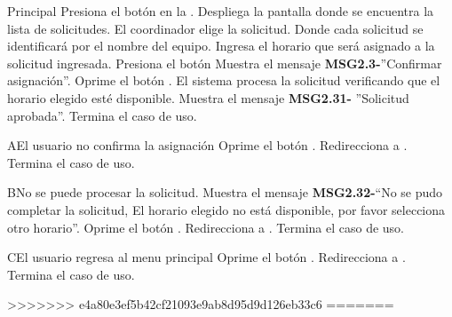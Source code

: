 	
	\begin{UCtrayectoria}{Principal}
	\UCpaso[\UCactor] Presiona el botón  en la . 
	\UCpaso Despliega la pantalla  donde se encuentra la lista de solicitudes. 
	\UCpaso[\UCactor] El coordinador elige la solicitud. Donde cada solicitud se identificará por el nombre del equipo.
	\UCpaso[\UCactor] Ingresa el horario que será asignado a la solicitud ingresada.
	\UCpaso[\UCactor] Presiona el botón 
	\UCpaso Muestra el mensaje {\bf MSG2.3-}''Confirmar asignación''.
	\UCpaso[\UCactor] Oprime el botón .	
	\UCpaso El sistema procesa la solicitud verificando que el horario elegido esté disponible.
	\UCpaso Muestra el mensaje {\bf MSG2.31-} ''Solicitud aprobada''.  
	\UCpaso[] Termina el caso de uso.   
\end{UCtrayectoria}

\begin{UCtrayectoriaA}{A}{El usuario no confirma la asignación}
	\UCpaso[\UCactor] Oprime el botón .
	\UCpaso Redirecciona a .
	\UCpaso Termina el caso de uso.
	\end{UCtrayectoriaA}

\begin{UCtrayectoriaA}{B}{No se puede procesar la solicitud.}
	\UCpaso Muestra el mensaje {\bf MSG2.32-}``No se pudo completar la solicitud, El horario elegido no está disponible, por favor selecciona otro horario''.
	\UCpaso[\UCactor] Oprime el botón .
	\UCpaso Redirecciona a .
	\UCpaso Termina el caso de uso.
	\end{UCtrayectoriaA}
		
\begin{UCtrayectoriaA}{C}{El usuario regresa al menu principal}
	\UCpaso[\UCactor] Oprime el botón .
	\UCpaso Redirecciona a .
	\UCpaso Termina el caso de uso.
	\end{UCtrayectoriaA}
	
>>>>>>> e4a80e3ef5b42cf21093e9ab8d95d9d126eb33c6
=======



